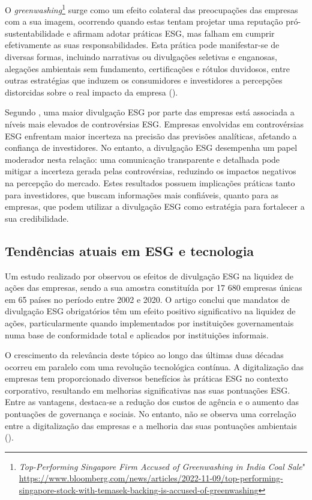 O \textit{greenwashing}\footnote{\textit{Top-Performing Singapore Firm Accused of Greenwashing in India Coal Sale}" \url{https://www.bloomberg.com/news/articles/2022-11-09/top-performing-singapore-stock-with-temasek-backing-is-accused-of-greenwashing}} surge como um efeito colateral das preocupações das empresas com a sua imagem, ocorrendo quando estas tentam projetar uma reputação pró-sustentabilidade e afirmam adotar práticas ESG, mas falham em cumprir efetivamente as suas responsabilidades. Esta prática pode manifestar-se de diversas formas, incluindo narrativas ou divulgações seletivas e enganosas, alegações ambientais sem fundamento, certificações e rótulos duvidosos, entre outras estratégias que induzem os consumidores e investidores a percepções distorcidas sobre o real impacto da empresa (\cite{Rau2024}).

Segundo \cite{Schiemann2022}, uma maior divulgação ESG por parte das empresas está associada a níveis mais elevados de controvérsias ESG. Empresas envolvidas em controvérsias ESG enfrentam maior incerteza na precisão das previsões analíticas, afetando a confiança de investidores. No entanto, a divulgação ESG desempenha um papel moderador nesta relação: uma comunicação transparente e detalhada pode mitigar a incerteza gerada pelas controvérsias, reduzindo os impactos negativos na percepção do mercado. Estes resultados possuem implicações práticas tanto para investidores, que buscam informações mais confiáveis, quanto para as empresas, que podem utilizar a divulgação ESG como estratégia para fortalecer a sua credibilidade.


\subsection{Tendências atuais em ESG e tecnologia}
\label{subsec: TAESG}

Um estudo realizado por \cite{Krueger2024} observou os efeitos de divulgação ESG na liquidez de ações das empresas, sendo a sua amostra constituída por 17 680 empresas únicas em 65 países no período entre 2002 e 2020. O artigo conclui que mandatos de divulgação ESG obrigatórios têm um efeito positivo significativo na liquidez de ações, particularmente quando implementados por instituições governamentais numa base de conformidade total e aplicados por instituições informais.

O crescimento da relevância deste tópico ao longo das últimas duas décadas ocorreu em paralelo com uma revolução tecnológica contínua. A digitalização das empresas tem proporcionado diversos benefícios às práticas ESG no contexto corporativo, resultando em melhorias significativas nas suas pontuações ESG. Entre as vantagens, destaca-se a redução dos custos de agência e o aumento das pontuações de governança e sociais. No entanto, não se observa uma correlação entre a digitalização das empresas e a melhoria das suas pontuações ambientais (\cite{Fang2023}).

